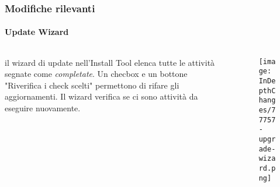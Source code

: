 \begin{frame}[fragile]
	\frametitle{Modifiche rilevanti}
	\framesubtitle{Update Wizard}

	\begin{columns}[T]
		\begin{column}{.5\textwidth}
			il wizard di update nell'Install Tool elenca tutte le attività segnate come \textit{completate}.
			\newline\newline
			Un checbox e un bottone "Riverifica i check scelti" permettono di rifare gli aggiornamenti.
			Il wizard verifica se ci sono attività da eseguire nuovamente.
		\end{column}
		\begin{column}{.5\textwidth}
			\begin{figure}\vspace*{-0.5cm}
				\texttt{[image: InDepthChanges/77757-upgrade-wizard.png]}
			\end{figure}
		\end{column}
	\end{columns}

\end{frame}









